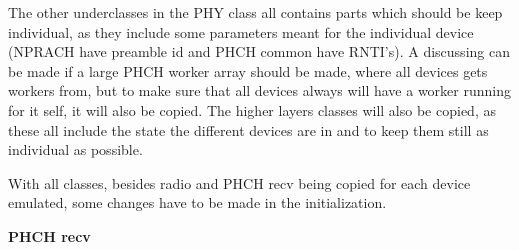 The other underclasses in the PHY class all contains parts which should be keep individual, as they include some parameters meant for the individual device (NPRACH have preamble id and PHCH common have RNTI's). A discussing can be made if a large PHCH worker array should be made, where all devices gets workers from, but to make sure that all devices always will have a worker running for it self, it will also be copied. The higher layers classes will also be copied, as these all include the state the different devices are in and to keep them still as individual as possible. 

With all classes, besides radio and PHCH recv being copied for each device emulated, some changes have to be made in the initialization.

\textbf{PHCH recv}\\



